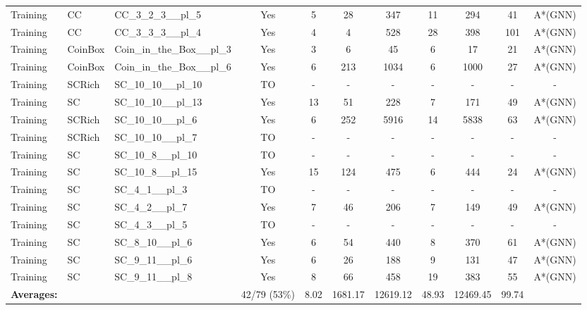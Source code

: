 \documentclass{article}
\begin{document}
\begin{tabular}{lllcccccccc}
Training & CC & CC\_3\_2\_3\_\_pl\_5 & Yes & 5 & 28 & 347 & 11 & 294 & 41 & A*(GNN) \\
Training & CC & CC\_3\_3\_3\_\_pl\_4 & Yes & 4 & 4 & 528 & 28 & 398 & 101 & A*(GNN) \\
Training & CoinBox & Coin\_in\_the\_Box\_\_pl\_3 & Yes & 3 & 6 & 45 & 6 & 17 & 21 & A*(GNN) \\
Training & CoinBox & Coin\_in\_the\_Box\_\_pl\_6 & Yes & 6 & 213 & 1034 & 6 & 1000 & 27 & A*(GNN) \\
Training & SCRich & SC\_10\_10\_\_pl\_10 & TO & - & - & - & - & - & - & - \\
Training & SC & SC\_10\_10\_\_pl\_13 & Yes & 13 & 51 & 228 & 7 & 171 & 49 & A*(GNN) \\
Training & SCRich & SC\_10\_10\_\_pl\_6 & Yes & 6 & 252 & 5916 & 14 & 5838 & 63 & A*(GNN) \\
Training & SCRich & SC\_10\_10\_\_pl\_7 & TO & - & - & - & - & - & - & - \\
Training & SC & SC\_10\_8\_\_pl\_10 & TO & - & - & - & - & - & - & - \\
Training & SC & SC\_10\_8\_\_pl\_15 & Yes & 15 & 124 & 475 & 6 & 444 & 24 & A*(GNN) \\
Training & SC & SC\_4\_1\_\_pl\_3 & TO & - & - & - & - & - & - & - \\
Training & SC & SC\_4\_2\_\_pl\_7 & Yes & 7 & 46 & 206 & 7 & 149 & 49 & A*(GNN) \\
Training & SC & SC\_4\_3\_\_pl\_5 & TO & - & - & - & - & - & - & - \\
Training & SC & SC\_8\_10\_\_pl\_6 & Yes & 6 & 54 & 440 & 8 & 370 & 61 & A*(GNN) \\
Training & SC & SC\_9\_11\_\_pl\_6 & Yes & 6 & 26 & 188 & 9 & 131 & 47 & A*(GNN) \\
Training & SC & SC\_9\_11\_\_pl\_8 & Yes & 8 & 66 & 458 & 19 & 383 & 55 & A*(GNN) \\
\textbf{Averages:} & & & 42/79 (53\%) & 8.02 & 1681.17 & 12619.12 & 48.93 & 12469.45 & 99.74 & \\
\bottomrule
\end{tabular}
\newpage
\end{document}

